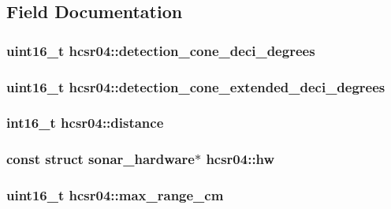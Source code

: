 \subsection{Field Documentation}
\hypertarget{structhcsr04_a3380a31d3ef464dd55cb0676f94fc874}{
\subsubsection[{detection\+\_\+cone\+\_\+deci\+\_\+degrees}]{\setlength{\rightskip}{0pt plus 5cm}uint16\+\_\+t hcsr04\+::detection\+\_\+cone\+\_\+deci\+\_\+degrees}}\label{structhcsr04_a3380a31d3ef464dd55cb0676f94fc874}
\hypertarget{structhcsr04_ab3533762a19351d70c91875d67386332}{
\subsubsection[{detection\+\_\+cone\+\_\+extended\+\_\+deci\+\_\+degrees}]{\setlength{\rightskip}{0pt plus 5cm}uint16\+\_\+t hcsr04\+::detection\+\_\+cone\+\_\+extended\+\_\+deci\+\_\+degrees}}\label{structhcsr04_ab3533762a19351d70c91875d67386332}
\hypertarget{structhcsr04_aa56e95ecd943eac4fe42eda1e030f14f}{
\subsubsection[{distance}]{\setlength{\rightskip}{0pt plus 5cm}int16\+\_\+t hcsr04\+::distance}}\label{structhcsr04_aa56e95ecd943eac4fe42eda1e030f14f}
\hypertarget{structhcsr04_aaf48111fe6c479ed6f24b435edd397a0}{
\subsubsection[{hw}]{\setlength{\rightskip}{0pt plus 5cm}const struct sonar\+\_\+hardware$\ast$ hcsr04\+::hw}}\label{structhcsr04_aaf48111fe6c479ed6f24b435edd397a0}
\hypertarget{structhcsr04_a1ffe6b9a0aef53bffed96e837e34d9ef}{
\subsubsection[{max\+\_\+range\+\_\+cm}]{\setlength{\rightskip}{0pt plus 5cm}uint16\+\_\+t hcsr04\+::max\+\_\+range\+\_\+cm}}\label{structhcsr04_a1ffe6b9a0aef53bffed96e837e34d9ef}
